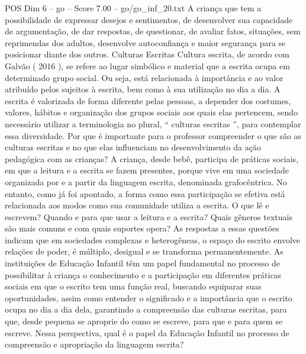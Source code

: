 \begin{textsample}{POS Dim 6 – go – Score 7.00 – go/go\_inf\_20.txt}
A criança que tem a possibilidade de expressar desejos e sentimentos, de desenvolver sua capacidade de argumentação, de dar respostas, de questionar, de avaliar fatos, situações, sem reprimendas dos adultos, desenvolve autoconfiança e maior segurança para se posicionar diante dos outros.
Culturas Escritas Cultura escrita, de acordo com Galvão ( 2016 ), se refere ao lugar simbólico e material que a escrita ocupa em determinado grupo social.
Ou seja, está relacionada à importância e ao valor atribuído pelos sujeitos à escrita, bem como à sua utilização no dia a dia.
A escrita é valorizada de forma diferente pelas pessoas, a depender dos costumes, valores, hábitos e organização dos grupos sociais aos quais elas pertencem, sendo necessário utilizar a terminologia no plural, “ culturas escritas ”, para contemplar essa diversidade.
Por que é importante para o professor compreender o que são as culturas escritas e no que elas influenciam no desenvolvimento da ação pedagógica com as crianças?
A criança, desde bebê, participa de práticas sociais, em que a leitura e a escrita se fazem presentes, porque vive em uma sociedade organizada por e a partir da linguagem escrita, denominada grafocêntrica.
No entanto, como já foi apontado, a forma como essa participação se efetiva está relacionada aos modos como sua comunidade utiliza a escrita.
O que lê e escrevem?
Quando e para que usar a leitura e a escrita?
Quais gêneros textuais são mais comuns e com quais suportes opera?
As respostas a essas questões indicam que em sociedades complexas e heterogêneas, o espaço do escrito envolve relações de poder, é múltiplo, desigual e se transforma permanentemente.
As instituições de Educação Infantil têm um papel fundamental no processo de possibilitar à criança o conhecimento e a participação em diferentes práticas sociais em que o escrito tem uma função real, buscando equiparar suas oportunidades, assim como entender o significado e a importância que o escrito ocupa no dia a dia dela, garantindo a compreensão das culturas escritas, para que, desde pequena se aproprie do como se escreve, para que e para quem se escreve.
Nessa perspectiva, qual é o papel da Educação Infantil no processo de compreensão e apropriação da linguagem escrita?

\end{textsample}
